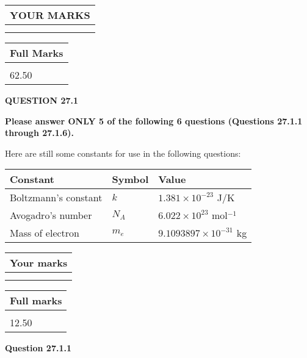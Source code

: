 \documentclass[12pt]{article}
\begin{document}
 
   
   
  
\vspace{0.2in}
  
\noindent\begin{tabular}{|l|}
\hline
 YOUR MARKS  \\
\hline
 \\ 
 \\ 
\hline
\end{tabular}
\hspace{0.05in} \begin{tabular}{|l|}
\hline
 Full Marks  \\
\hline
 \\ 
62.50 \\
\hline
\end{tabular}
{\textbf{\Large{QUESTION
27.1 
}}}
  
  
 
{\textbf{\Large{Please answer ONLY
5 of the following
6 questions (Questions
27.1.1 through
27.1.6). }}}
 
Here are still some constants for use in the following questions:
 
 
\noindent\begin{tabular}{|l|l|l|}
\hline
Constant & Symbol & Value \\
\hline
 
Boltzmann's constant &
$k$ &
 $ 1.381 \times 10^{-23} $
J/K \\
\hline
 
Avogadro's number &
$N_A$ &
 $ 6.022 \times 10^{23} $
mol$^{-1}$ \\
\hline
 
Mass of electron &
$m_e$ &
 $ 9.1093897 \times 10^{-31} $
kg \\
\hline
 
\end{tabular}
 
  
\vspace{0.2in}
  
         \begin{tabular}{|l|}
\hline
 Your marks  \\
\hline
 \\ 
 \\ 
\hline
\end{tabular}
\hspace{0.05in} \begin{tabular}{|l|}
\hline
 Full marks  \\
\hline
 \\ 
12.50 \\
\hline
\end{tabular}
{\textbf{\Large{Question
27.1.1 
}}}
  
\end{document}
